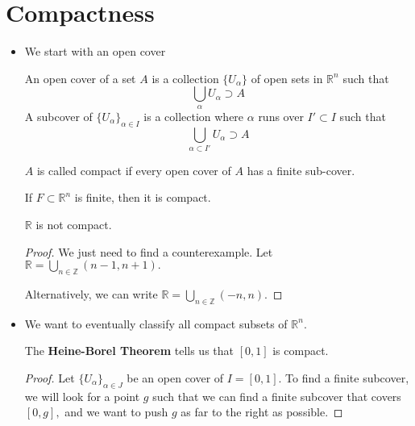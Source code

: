 \section{Compactness}
\begin{itemize}
    \item We start with an open cover
          \begin{definition}
              An open cover of a set $A$ is a collection $\{U_\alpha\}$ of open sets in $\mathbb{R}^n$ such that
              \begin{equation}
                  \bigcup_\alpha U_\alpha \supset A
              \end{equation}
              A subcover of $\{U_\alpha\}_{\alpha \in I}$ is a collection where $\alpha$ runs over $I' \subset I$ such that
              \begin{equation}
                  \bigcup_{\alpha \subset I'} U_\alpha \supset A
              \end{equation}
          \end{definition}
          \begin{definition}
              $A$ is called compact if every open cover of $A$ has a finite sub-cover.
          \end{definition}
          \begin{example}
              If $F \subset \mathbb{R}^n$ is finite, then it is compact.
          \end{example}
          \begin{example}
              $\mathbb{R}$ is not compact.
              \begin{proof}
                  We just need to find a counterexample. Let $\mathbb{R} = \bigcup_{n\in \mathbb{Z}} (n-1,n+1).$
                  \vspace{2mm}

                  Alternatively, we can write $\mathbb{R} = \bigcup_{n\in \mathbb{Z}} (-n,n).$
              \end{proof}
          \end{example}
    \item We want to eventually classify all compact subsets of $\mathbb{R}^n$.
          \begin{theorem}
              The \textbf{Heine-Borel Theorem} tells us that $[0,1]$ is compact.
          \end{theorem}
          \begin{proof}
              Let $\{U_\alpha\}_{\alpha \in J}$ be an open cover of $I=[0,1].$ To find a finite subcover, we will look for a point $g$ such that we can find a finite subcover that covers $[0,g],$ and we want to push $g$ as far to the right as possible.
              \vspace{2mm}


\end{proof}
\end{itemize}
